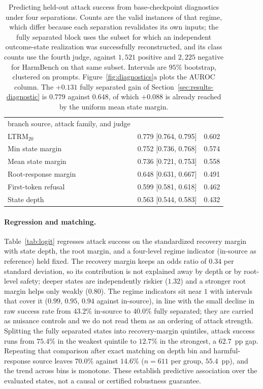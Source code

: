 \documentclass[11pt]{article}
\newcommand{\ltrm}{LTRM}
\begin{document}
\begin{table}[t]
\begin{tabular}{lcc}
{      branch source, attack family, and judge} \\
    \ltrm{}\(_{20}\)         & 0.779 [0.764, 0.795] & 0.602 \\
    Min state margin         & 0.752 [0.736, 0.768] & 0.574 \\
    Mean state margin        & 0.736 [0.721, 0.753] & 0.558 \\
    Root-response margin     & 0.648 [0.631, 0.667] & 0.491 \\
    First-token refusal      & 0.599 [0.581, 0.618] & 0.462 \\
    State depth              & 0.563 [0.544, 0.583] & 0.432 \\
    \bottomrule
  \end{tabular}
  \caption{Predicting held-out attack success from base-checkpoint diagnostics
  under four separations. Counts are the valid instances of that regime, which
  differ because each separation revalidates its own inputs; the fully separated
  block uses the subset for which an independent outcome-state realization was
  successfully reconstructed, and its class counts use the fourth judge, against
  \(1{,}521\) positive and \(2{,}225\) negative for HarmBench on that same
  subset. Intervals are \(95\%\) bootstrap, clustered on prompts.
  Figure~\ref{fig:diagnostics}a plots the AUROC column. The \(+0.131\) fully separated gain of
  Section~\ref{sec:results-diagnostic} is \(0.779\) against \(0.648\), of which
  \(+0.088\) is already reached by the uniform mean state margin.}
  \label{tab:diagnostics}
\end{table}

\paragraph{Regression and matching.}
Table~\ref{tab:logit} regresses attack success on the standardized recovery
margin with state depth, the root margin, and a four-level regime indicator
(in-source as reference) held fixed. The
recovery margin keeps an odds ratio of \(0.34\) per standard deviation, so its
contribution is not explained away by depth or by root-level safety; deeper
states are independently riskier (\(1.32\)) and a stronger root margin helps only
weakly (\(0.80\)). The regime indicators sit near \(1\) with intervals that
cover it (\(0.99\), \(0.95\), \(0.94\) against in-source), in line with the small
decline in raw success rate from \(43.2\)\% in-source to \(40.0\)\% fully
separated; they are carried as nuisance controls and we do not read them as an
ordering of attack strength. Splitting the fully separated states into recovery-margin
quintiles, attack success runs from \(75.4\)\% in the weakest quintile to
\(12.7\)\% in the strongest, a \(62.7\)~pp gap. Repeating that comparison after
exact matching on depth bin and harmful-response source leaves \(70.0\)\%
against \(14.6\)\% (\(n=611\) per group, \(55.4\)~pp), and the trend across bins
is monotone. These establish
predictive association over the evaluated states, not a causal or certified
robustness guarantee.
\end{document}
